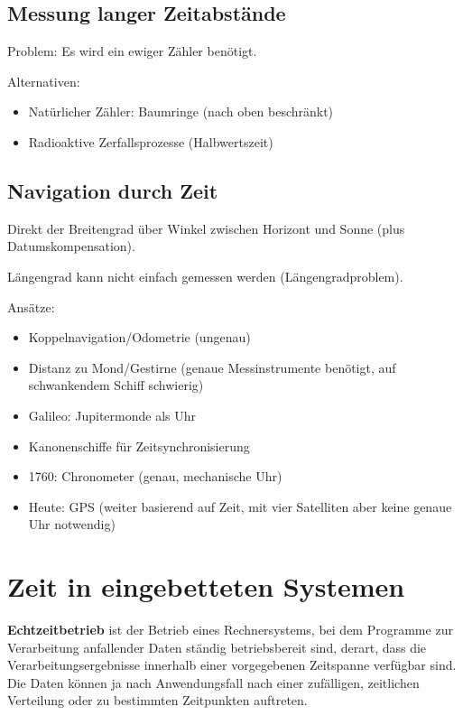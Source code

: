 \subsection{Messung langer Zeitabstände}
Problem: Es wird ein \glqq{}ewiger Zähler\grqq{} benötigt.

Alternativen:
\begin{itemize}
    \item Natürlicher Zähler: Baumringe (nach oben beschränkt)
    \item Radioaktive Zerfallsprozesse (Halbwertszeit)
\end{itemize}

\subsection{Navigation durch Zeit}
Direkt der Breitengrad über Winkel zwischen Horizont und Sonne (plus Datumskompensation).

Längengrad kann nicht einfach gemessen werden (\glqq{}Längengradproblem\grqq{}).

Ansätze:
\begin{itemize}
    \item Koppelnavigation/Odometrie (ungenau)
    \item Distanz zu Mond/Gestirne (genaue Messinstrumente benötigt, auf schwankendem Schiff schwierig)
    \item Galileo: Jupitermonde als Uhr
    \item Kanonenschiffe für Zeitsynchronisierung
    \item 1760: Chronometer (genau, mechanische Uhr)
    \item Heute: GPS (weiter basierend auf Zeit, mit vier Satelliten aber keine genaue Uhr notwendig)
\end{itemize}

\section{Zeit in eingebetteten Systemen}
\begin{tcolorbox}
    \textbf{Echtzeitbetrieb} ist der Betrieb eines Rechnersystems, bei dem Programme zur 
    Verarbeitung anfallender Daten ständig betriebsbereit sind, derart, dass die
    Verarbeitungsergebnisse innerhalb einer vorgegebenen Zeitspanne verfügbar sind.
    Die Daten können ja nach Anwendungsfall nach einer zufälligen, zeitlichen Verteilung
    oder zu bestimmten Zeitpunkten auftreten.
\end{tcolorbox}

